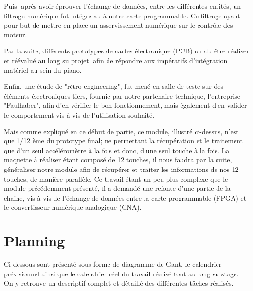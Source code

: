 \documentclass[french,a4paper,12pt]{report}
\begin{document}
	Puis, après avoir éprouver l'échange de données, entre les différentes entités, un filtrage numérique fut intégré au à notre carte programmable. Ce filtrage ayant pour but de mettre en place un asservissement numérique sur le contrôle des moteur.
	

	Par la suite, différents prototypes de cartes électronique (PCB) on du être réaliser et réévalué au long su projet, afin de répondre aux impératifs d'intégration matériel au sein du piano.
	
	Enfin, une étude de "rétro-engineering", fut mené en salle de teste sur des éléments électroniques tiers, fournie par notre partenaire technique, l'entreprise "Faulhaber", afin d'en vérifier le bon fonctionnement, mais également d'en valider le comportement vis-à-vis de l'utilisation souhaité.
	
	Mais comme expliqué en ce début de partie, ce module, illustré ci-dessus, n'est que 1/12 ème du prototype final; ne permettant la récupération et le traitement que d'un seul accéléromètre à la fois et donc, d'une seul touche à la fois.\newline	
	La maquette à réaliser étant composé de 12 touches, il nous faudra par la suite, généraliser notre module afin de récupérer et traiter les informations de nos 12 touches, de manière parallèle.
	Ce travail étant un peu plus complexe que le module précédemment présenté, il a demandé une refonte d'une partie de la chaine, vis-à-vis de l'échange de données entre la carte programmable (FPGA) et le convertisseur numérique analogique (CNA).
	
	\chapter{Planning}

	Ci-dessous sont présenté sous forme de diagramme de Gant, le calendrier prévisionnel ainsi que le calendrier réel du travail réalisé tout au long su stage.
	On y retrouve un descriptif complet et détaillé des différentes tâches réalisés.
	
	
	
	
	
	
	
\end{document}
